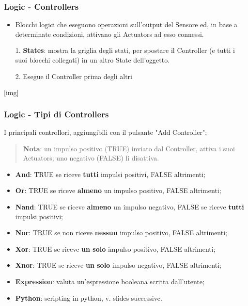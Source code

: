 \documentclass{beamer}
\begin{document}
		\begin{frame}
			\frametitle{Logic - Controllers} %
			\begin{itemize}
				\item Blocchi logici che \textcolor{BlenderOrange}{eseguono operazioni} sull'output del Sensore ed, in base a determinate condizioni, \textcolor{BlenderOrange}{attivano gli Actuators} ad esso connessi.
				\item[1.] \textbf{States}: mostra la griglia degli stati, per spostare il Controller (e tutti i suoi blocchi collegati) in un altro State dell'oggetto.
				\item[2.]Esegue il Controller prima degli altri
			\end{itemize}
			[img]
		\end{frame}	
		\begin{frame}
			\frametitle{Logic - Tipi di Controllers}
			I principali controllori, aggiungibili con il pulsante "Add Controller":
			\begin{quote}
			\textcolor{BlenderOrange}{\textbf{Nota}: un impulso positivo (TRUE) inviato dal Controller, attiva i suoi Actuators; uno negativo (FALSE) li disattiva.}
			\end{quote}
			\begin{itemize}
				\item \textbf{And}: {\footnotesize TRUE se riceve \textbf{tutti} impulsi positivi, FALSE altrimenti;}
				\item \textbf{Or}: {\footnotesize TRUE se riceve \textbf{almeno} un impulso positivo, FALSE altrimenti;}
				\item \textbf{Nand}: {\footnotesize TRUE se riceve \textbf{almeno} un impulso negativo, FALSE se riceve \textbf{tutti} impulsi positivi;}
				\item \textbf{Nor}: {\footnotesize TRUE se non riceve \textbf{nessun} impulso positivo, FALSE altrimenti;}
				\item \textbf{Xor}: {\footnotesize TRUE se riceve \textbf{un solo} impulso positivo, FALSE altrimenti;}
				\item \textbf{Xnor}: {\footnotesize TRUE se riceve \textbf{un solo} impulso negativo, FALSE altrimenti;}
				\item \textbf{Expression}: {\footnotesize valuta un'espressione booleana scritta dall'utente;}
				\item \textbf{Python}: {\footnotesize scripting in python, v. slides successive.}
			\end{itemize}
		\end{frame}
		
\end{document}

